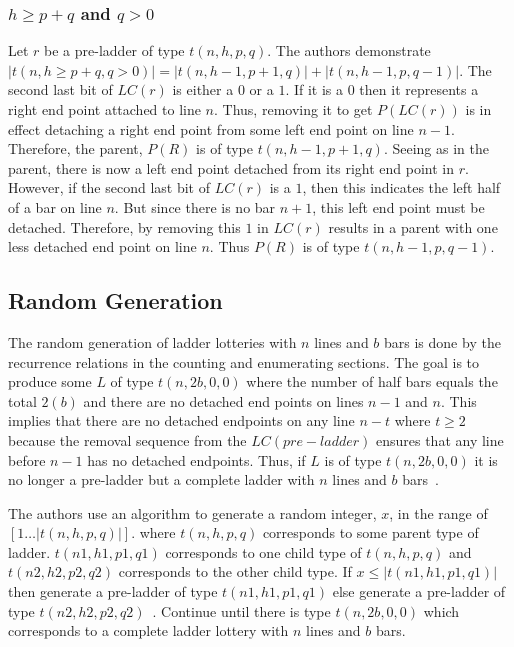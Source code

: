 \subsubsection{ $h\geq p+q$ and $q>0$}
Let $r$ be a pre-ladder of type $t(n,h,p,q)$. The authors 
demonstrate $|t(n,h\geq p+q,q>0)|=|t(n,h-1,p+1,q)|+|t(n,h-1,p,q-1)|$.\cite{A6} 
The second last bit of $LC(r)$ is either a $0$ 
or a $1$. If it is a $0$ then it represents a 
right end point attached to line $n$. Thus, 
removing it to get $P(LC(r))$ is in effect 
detaching a right end point from some left end point 
on line $n-1$. Therefore, the parent, $P(R)$ is 
of type $t(n,h-1,p+1,q)$. Seeing as in the parent, 
there is now a left end point detached from its right 
end point in $r$. However, if the second last bit 
of $LC(r)$ is a $1$, then this indicates the left 
half of a bar on line $n$. But since there is no 
bar $n+1$, this left end point must be detached. 
Therefore, by removing this $1$ in $LC(r)$ results 
in a parent with one less detached end point on line $n$.
Thus $P(R)$ is of type $t(n,h-1,p,q-1)$.
\subsection{Random Generation}
The random generation of ladder lotteries with $n$ lines and
$b$ bars is done by the recurrence relations in the counting 
and enumerating sections. The goal is to produce 
some $L$ of type $t(n,2b,0,0)$ where the number of half 
bars equals the total $2(b)$ and there are no detached 
end points on lines $n-1$ and $n$. This implies that there 
are no detached endpoints on any line $n-t$ where $t\geq2$
because the removal sequence from the $LC(pre-ladder)$
ensures that any line before $n-1$ has no detached endpoints. Thus, 
if $L$ is of type $t(n,2b,0,0)$ it is no longer a pre-ladder 
but a complete ladder with $n$ lines and $b$ bars~\cite{A6}.\par 
The authors use an algorithm to generate a random integer, $x$,
in the range of $[1 \dots |t(n,h,p,q)|]$. where $t(n,h,p,q)$ corresponds to some 
parent type of ladder. $t(n1,h1,p1,q1)$ corresponds to one 
child type of $t(n,h,p,q)$ and $t(n2,h2,p2,q2)$ corresponds 
to the other child type. If $x\leq|t(n1,h1,p1,q1)|$ then generate 
a pre-ladder of type $t(n1,h1,p1,q1)$ else generate a pre-ladder 
of type $t(n2,h2,p2,q2)$~\cite{A6}. Continue until there is type $t(n,2b,0,0)$
which corresponds to a complete ladder lottery with $n$ lines and $b$ bars.